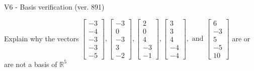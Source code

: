 \begin{exercise}
  \begin{exerciseTitle}V6 - Basis verification (ver. 891)\end{exerciseTitle}
  \begin{exerciseStatement}
    Explain why the vectors \(\left[\begin{array}{r}
-3 \\
-4 \\
-3 \\
-3 \\
-5
\end{array}\right] , \left[\begin{array}{r}
-3 \\
0 \\
-3 \\
3 \\
-2
\end{array}\right] , \left[\begin{array}{r}
2 \\
0 \\
4 \\
-3 \\
-1
\end{array}\right] , \left[\begin{array}{r}
3 \\
3 \\
4 \\
-4 \\
-4
\end{array}\right] , \text{ and } \left[\begin{array}{r}
6 \\
-3 \\
5 \\
-5 \\
10
\end{array}\right]\) are or are not a basis of \(\mathbb{R}^5\)	



\end{exerciseStatement}
\end{exercise}

